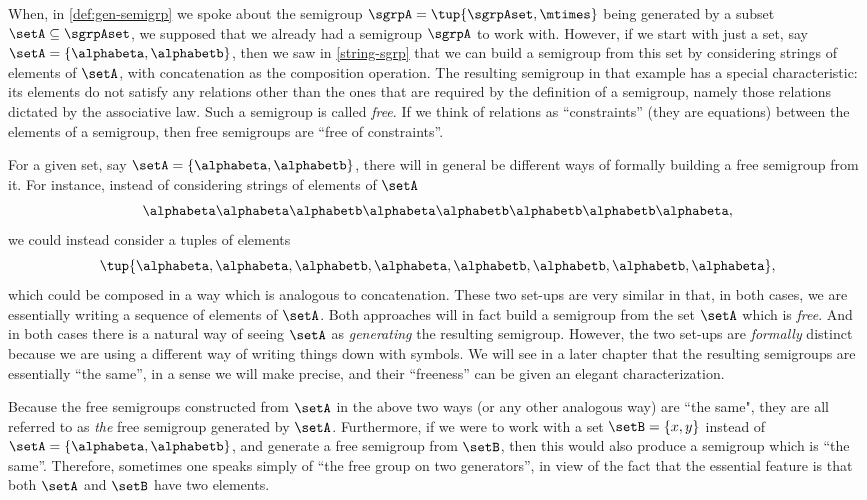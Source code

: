 When, in \cref{def:gen-semigrp} we spoke about the semigroup $\sgrpA = \tup{\sgrpAset, \mtimes}$  being generated by a subset $\setA \subseteq \sgrpAset$, we supposed that we already had a semigroup $\sgrpA$ to work with. However, if we start with just a set, say $\setA = \{ \alphabeta, \alphabetb\}$, then we saw in \cref{string-sgrp} that we can build a semigroup from this set by considering strings of elements of $\setA$, with concatenation as the composition operation. The resulting semigroup in that example has a special characteristic: its elements do not satisfy any relations other than the ones that are required by the definition of a semigroup, namely those relations dictated by the associative law. Such a semigroup is called \emph{free}. If we think of relations as ``constraints'' (they are equations) between the elements of a semigroup, then free semigroups are ``free of constraints''.

For a given set, say $\setA = \{ \alphabeta, \alphabetb\}$, there will in general be different ways of formally building a free semigroup from it. For instance, instead of considering strings of elements of $\setA$
\begin{equation}
  \alphabeta\alphabeta \alphabetb \alphabeta \alphabetb \alphabetb \alphabetb \alphabeta,
\end{equation}
we could instead consider a tuples of elements
\begin{equation}
  \tup{ \alphabeta, \alphabeta,  \alphabetb,  \alphabeta,  \alphabetb,  \alphabetb,  \alphabetb,  \alphabeta},
\end{equation}
which could be composed in a way which is analogous to concatenation. These two set-ups are very similar in that, in both cases, we are essentially writing a sequence of elements of $\setA$. Both approaches will in fact build a semigroup from the set $\setA$ which is \emph{free}. And in both cases there is a natural way of seeing $\setA$ as \emph{generating} the resulting semigroup. However, the two set-ups are \emph{formally} distinct because we are using a different way of writing things down with symbols. We will see in a later chapter that the resulting semigroups are essentially ``the same'', in a sense we will make precise, and their ``freeness'' can be given an elegant characterization.

Because the free semigroups constructed from $\setA$ in the above two ways (or any other analogous way) are ``the same", they are all referred to as \emph{the} free semigroup generated by $\setA$. Furthermore, if we were to work with a set $\setB = \{ x, y \}$ instead of $\setA = \{ \alphabeta, \alphabetb\}$, and generate a free semigroup from $\setB$, then this would also produce a semigroup which is ``the same''. Therefore, sometimes one speaks simply of ``the free group on two generators'', in view of the fact that the essential feature is that both $\setA$ and $\setB$ have two elements.

